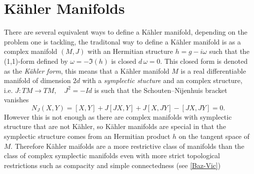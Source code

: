 \documentclass[12pt,twoside,a4paper]{report}
\begin{document}
  \section{Kähler Manifolds}
  There are several equivalent ways to define a K\"ahler manifold, depending on the problem one is tackling, the traditonal way to define a Kähler manifold is as a complex manifold $(M,J)$ with an Hermitian structure $h=g-i\omega$ such that the (1,1)-form defined by $\omega=-\Im (h)$ is closed $d\,\omega=0$. This closed form is denoted as the \emph{K\"ahler form}, this means that a Kähler manifold $M$ is a real differentiable manifold of dimension $2d$ with a \emph{symplectic stucture} and an complex structure, i.e. $J:TM\rightarrow TM,\quad J^2=-Id$ is such that the Schouten–Nijenhuis bracket vanishes
  \[
    N_{J}(X,Y)=[X,Y]+J[JX,Y]+J[X,JY]-[JX,JY]=0.
  \]
  However this is not enough as there are complex manifolds with symplectic structure that are not Kähler, so Kähler manifolds are special in that the symplectic structure comes from an Hermitian product $h$ on the tangent space of $M$. Therefore Kähler maifolds are a more restrictive class of manifolds than the class of complex symplectic manifolds even with more strict topological restrictions such as compacity and simple connectedness (see \ref{Baz-Vic})
\end{document}
